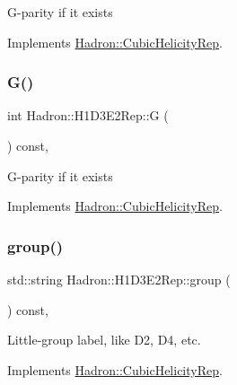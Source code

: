 G-\/parity if it exists 

Implements \mbox{\hyperlink{structHadron_1_1CubicHelicityRep_a50689f42be1e6170aa8cf6ad0597018b}{Hadron\+::\+Cubic\+Helicity\+Rep}}.

\mbox{\label{structHadron_1_1H1D3E2Rep_a88ee6e489859f4eada7e37ac4333c6fd}} 
\subsubsection{\texorpdfstring{G()}{G()}\hspace{0.1cm}{\footnotesize\ttfamily [2/2]}}
{\footnotesize\ttfamily int Hadron\+::\+H1\+D3\+E2\+Rep\+::G (\begin{DoxyParamCaption}{ }\end{DoxyParamCaption}) const\hspace{0.3cm}{\ttfamily [inline]}, {\ttfamily [virtual]}}

G-\/parity if it exists 

Implements \mbox{\hyperlink{structHadron_1_1CubicHelicityRep_a50689f42be1e6170aa8cf6ad0597018b}{Hadron\+::\+Cubic\+Helicity\+Rep}}.

\mbox{\label{structHadron_1_1H1D3E2Rep_aeb5e2d7d6d716039d61a8262627b7853}} 
\subsubsection{\texorpdfstring{group()}{group()}\hspace{0.1cm}{\footnotesize\ttfamily [1/3]}}
{\footnotesize\ttfamily std\+::string Hadron\+::\+H1\+D3\+E2\+Rep\+::group (\begin{DoxyParamCaption}{ }\end{DoxyParamCaption}) const\hspace{0.3cm}{\ttfamily [inline]}, {\ttfamily [virtual]}}

Little-\/group label, like D2, D4, etc. 

Implements \mbox{\hyperlink{structHadron_1_1CubicHelicityRep_a101a7d76cd8ccdad0f272db44b766113}{Hadron\+::\+Cubic\+Helicity\+Rep}}.

\mbox{\label{structHadron_1_1H1D3E2Rep_aeb5e2d7d6d716039d61a8262627b7853}} 
